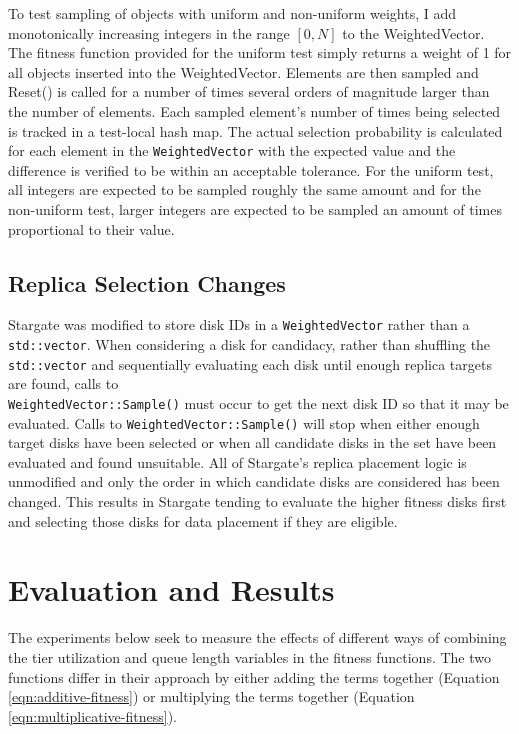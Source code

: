 \documentclass[12pt]{article}
\begin{document}
    To test sampling of objects with uniform and non-uniform weights, I add
    monotonically increasing integers in the range $[0,N]$ to the
    WeightedVector. The fitness function provided for the uniform test simply
    returns a weight of 1 for all objects inserted into the WeightedVector.
    Elements are then sampled and Reset() is called for a number of times
    several orders of magnitude larger than the number of elements. Each
    sampled element's number of times being selected is tracked in a test-local
    hash map. The actual selection probability is calculated for each element
    in the \texttt{WeightedVector} with the expected value and the difference is
    verified to be within an acceptable tolerance. For the uniform test, all
    integers are expected to be sampled roughly the same amount and for the
    non-uniform test, larger integers are expected to be sampled an amount of
    times proportional to their value.

  \subsection{Replica Selection Changes}
    
  Stargate was modified to store disk IDs in a \texttt{WeightedVector} rather
  than a \texttt{std::vector}. When considering a disk for candidacy, rather
  than shuffling the \texttt{std::vector} and sequentially evaluating each disk
  until enough replica targets are found, calls to \\
  \texttt{WeightedVector::Sample()} must occur to get the next disk ID so that
  it may be evaluated. Calls to \texttt{WeightedVector::Sample()} will stop
  when either enough target disks have been selected or when all candidate
  disks in the set have been evaluated and found  unsuitable.  All of
  Stargate's replica placement logic is unmodified and only the order in which
  candidate disks are considered has been changed. This results in Stargate
  tending to evaluate the higher fitness disks first and selecting those disks
  for data placement if they are eligible.
      

\newpage
\FloatBarrier
\section{Evaluation and Results}

The experiments below seek to measure the effects of different ways of
combining the tier utilization and queue length variables in the fitness
functions. The two functions differ in their approach by either adding the
terms together (Equation \ref{eqn:additive-fitness}) or multiplying the terms
together (Equation \ref{eqn:multiplicative-fitness}).
\end{document}

